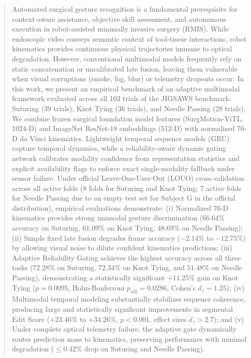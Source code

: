 \documentclass[10pt,journal]{IEEEtran}
\begin{document}
\begin{abstract}
Automated surgical gesture recognition is a fundamental prerequisite for context-aware assistance, objective skill assessment, and autonomous execution in robot-assisted minimally invasive surgery (RMIS). While endoscopic video conveys semantic context of tool-tissue interactions, robot kinematics provides continuous physical trajectories immune to optical degradation. However, conventional multimodal models frequently rely on static concatenation or uncalibrated late fusion, leaving them vulnerable when visual corruptions (smoke, fog, blur) or telemetry dropouts occur. In this work, we present an empirical benchmark of an adaptive multimodal framework evaluated across all 103 trials of the JIGSAWS benchmark: Suturing (39 trials), Knot Tying (36 trials), and Needle Passing (28 trials). We combine frozen surgical foundation model features (SurgMotion-ViTL, 1024-D) and ImageNet ResNet-18 embeddings (512-D) with normalized 76-D da Vinci kinematics. Lightweight temporal sequence models (GRU) capture temporal dynamics, while a reliability-aware dynamic gating network calibrates modality confidence from representation statistics and explicit availability flags to enforce exact single-modality fallback under sensor failure. Under official Leave-One-User-Out (LOUO) cross-validation across all active folds (8 folds for Suturing and Knot Tying; 7 active folds for Needle Passing due to an empty test set for Subject G in the official distribution), empirical evaluations demonstrate: (i) Normalized 76-D kinematics provides strong unimodal gesture discrimination ($66.64\%$ accuracy on Suturing, $61.09\%$ on Knot Tying, $48.69\%$ on Needle Passing); (ii) Simple fixed late fusion degrades frame accuracy ($-2.14\%$ to $-12.75\%$) by allowing visual noise to dilute confident kinematics predictions; (iii) Adaptive Reliability Gating achieves the highest accuracy across all three tasks ($72.28\%$ on Suturing, $72.34\%$ on Knot Tying, and $51.48\%$ on Needle Passing), demonstrating a statistically significant $+11.25\%$ gain on Knot Tying ($p=0.0095$, Holm-Bonferroni $p_{\text{adj}}=0.0286$, Cohen's $d_z=1.25$); (iv) Multimodal temporal modeling substantially stabilizes sequence coherence, producing large and statistically significant improvements in segmental Edit Score ($+23.46\%$ to $+34.26\%$, $p < 0.001$, effect sizes $d_z > 2.7$); and (v) Under complete optical telemetry failure, the adaptive gate dynamically routes prediction mass to kinematics, preserving performance with minimal degradation ($\le 0.42\%$ drop on Suturing and Needle Passing).
\end{abstract}
\end{document}
